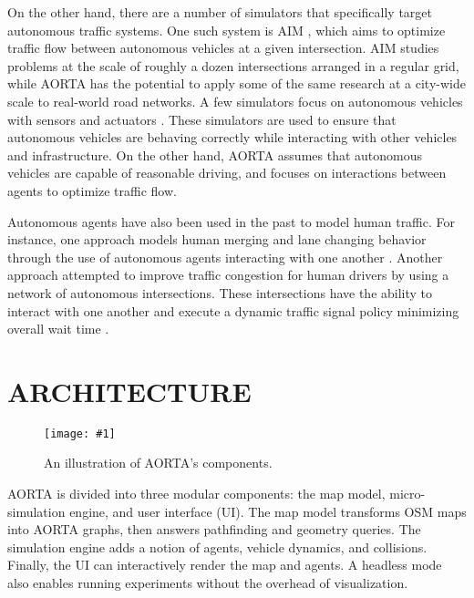 \documentclass[letterpaper, 10 pt, conference]{ieeeconf}  %
\newcommand{\pix}[3]{
  \begin{figure}[h]
    \centering \texttt{[image: \#1]}
    \caption{#2}
  \end{figure}
}
\begin{document}
On the other hand, there are a number of simulators that specifically
target autonomous traffic systems. One such system is AIM
\cite{JAIR08-dresner}, which aims to optimize traffic flow between
autonomous vehicles at a given intersection. AIM studies problems at
the scale of roughly a dozen intersections arranged in a regular grid,
while AORTA has the potential to apply some of the same research at a
city-wide scale to real-world road networks. A few simulators focus on
autonomous vehicles with sensors and actuators
\cite{figueiredo2009approach}. These simulators are used to ensure
that autonomous vehicles are behaving correctly while interacting with
other vehicles and infrastructure. On the other hand, AORTA assumes
that autonomous vehicles are capable of reasonable driving, and
focuses on interactions between agents to optimize traffic flow.

Autonomous agents have also been used in the past to model human
traffic. For instance, one approach models human merging and lane
changing behavior through the use of autonomous agents interacting
with one another \cite{hidas2002modelling}. Another approach attempted
to improve traffic congestion for human drivers by using a network of
autonomous intersections.  These intersections have the ability to
interact with one another and execute a dynamic traffic signal policy
minimizing overall wait time \cite{manikonda2001autonomous}.



\section{ARCHITECTURE}
\label{sec:arch}


\pix{architecture.png}
    {An illustration of AORTA's components.}
    {scale=0.18}

AORTA is divided into three modular components: the map model, micro-simulation
engine, and user interface (UI). The map model transforms OSM maps into AORTA graphs, then
answers pathfinding and geometry queries. The simulation engine adds a notion of
agents, vehicle dynamics, and collisions. Finally, the UI can
interactively render the map and agents. A headless mode also enables running
experiments without the overhead of visualization.
\end{document}
